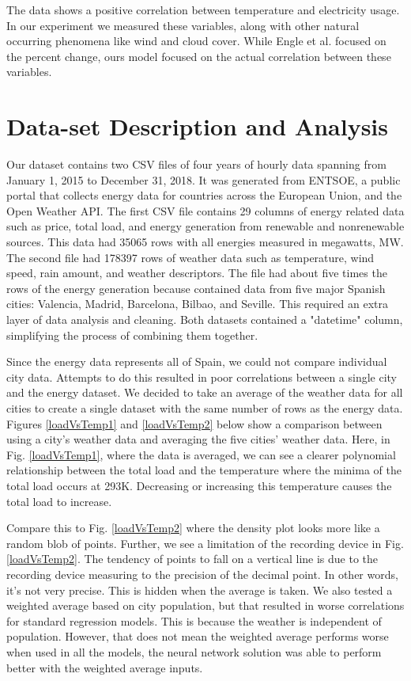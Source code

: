 \documentclass[10pt]{article}
\begin{document}
The data shows a positive correlation between temperature and electricity usage. In our experiment we measured these variables, along with other natural occurring phenomena like wind and cloud cover. While Engle et al. focused on the percent change, ours model focused on the actual correlation between these variables.


\section{Data-set Description and Analysis}\label{sec:3}
Our dataset contains two CSV files of four years of hourly data spanning from January 1, 2015 to December 31, 2018. It was generated from ENTSOE, a public portal that collects energy data for countries across the European Union, and the Open Weather API. The first CSV file contains 29 columns of energy related data such as price, total load, and energy generation from renewable and nonrenewable sources. This data had 35065 rows with all energies measured in megawatts, MW. The second file had 178397 rows of weather data such as temperature, wind speed, rain amount, and weather descriptors. The file had about five times the rows of the energy generation because contained data from five major Spanish cities: Valencia, Madrid, Barcelona, Bilbao, and Seville. This required an extra layer of data analysis and cleaning. Both datasets contained a "datetime" column, simplifying the process of combining them together.


Since the energy data represents all of Spain, we could not compare individual city data. Attempts to do this resulted in poor correlations between a single city and the energy dataset. We decided to take an average of the weather data for all cities to create a single dataset with the same number of rows as the energy data. Figures \ref{loadVsTemp1} and \ref{loadVsTemp2} below show a comparison between using a city's weather data and averaging the five cities’ weather data. Here, in Fig. \ref{loadVsTemp1}, where the data is averaged, we can see a clearer polynomial relationship between the total load and the temperature where the minima of the total load occurs at 293K. Decreasing or increasing this temperature causes the total load to increase. 

Compare this to Fig. \ref{loadVsTemp2} where the density plot looks more like a random blob of points. Further, we see a limitation of the recording device in Fig. \ref{loadVsTemp2}. The tendency of points to fall on a vertical line is due to the recording device measuring to the precision of the decimal point. In other words, it's not very precise. This is hidden when the average is taken. We also tested a weighted average based on city population, but that resulted in worse correlations for standard regression models. This is because the weather is independent of population. However, that does not mean the weighted average performs worse when used in all the models, the neural network solution was able to perform better with the weighted average inputs.
\end{document}
